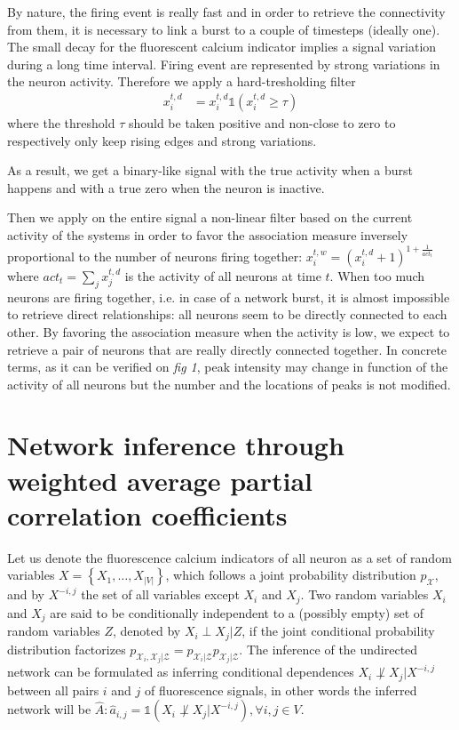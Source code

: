 \documentclass[wcp]{jmlr}
\begin{document}
By nature, the firing event is really fast and in order to
retrieve the connectivity from them, it is necessary to link a burst to a
couple of timesteps (ideally one). The small decay for the fluorescent calcium
indicator implies a signal
variation during a long time interval. Firing event are represented by strong
variations in the neuron activity. Therefore we apply a hard-tresholding
filter
\begin{align}
x^{t,d}_i &= x^{t,d}_i \mathbb{1}(x^{t,d}_i \geq \tau)
\end{align}
where the threshold $\tau$ should be taken positive and non-close to zero to
respectively only keep rising edges and strong variations.


As a result, we get a binary-like signal with the true activity when a burst
happens and with a true zero when the neuron is inactive.


Then we apply on the entire signal a non-linear filter based on the current
activity of the systems in order to favor the association measure inversely
proportional to the number of neurons firing together: $ x^{t,w}_i  =
(x^{t,d}_i + 1 )^{1 + \frac{1}{act_t}}$ where $act_t = \sum_{j} x^{t,d}_j$ is
the activity of all neurons at time $t$. When too much neurons are firing
together, i.e. in case of a network burst, it is almost impossible to retrieve
direct relationships: all neurons seem to be directly connected to each other.
By favoring the association measure when the activity is low, we expect to
retrieve a pair of neurons that are really directly connected together. In
concrete terms, as it can be verified on \textit{fig 1}, peak intensity may
change in function of the activity of all neurons but the number and the
locations of peaks is not modified.


\section{Network inference through weighted average partial correlation
            coefficients}
\label{sec:inference}

Let us denote the fluorescence calcium indicators of all neuron
as a set of random variables $X = \left\{X_1, \ldots, X_{|V|}\right\}$, which follows
a joint probability distribution $p_\mathcal{X}$, and by
$X^{-i,j}$ the set of all variables except $X_i$ and $X_j$.
Two random variables $X_i$ and $X_j$ are said to be conditionally independent
to a (possibly empty) set of random variables $Z$, denoted by $X_i \perp X_j | Z$,
if the joint conditional probability distribution factorizes
$p_{\mathcal{X}_i, \mathcal{X}_j|\mathcal{Z}} = p_{\mathcal{X}_i|\mathcal{Z}}
p_{\mathcal{X}_j|\mathcal{Z}}$.  The inference of the undirected network
can be formulated as inferring conditional dependences
$X_i \not\perp X_j | X^{-i,j}$ between all pairs $i$ and $j$ of fluorescence
signals, in other words the inferred network will be
$\hat{A}: \hat{a}_{i,j} = \mathbb{1}(X_i \not\perp X_j | X^{-i,j}), \forall i, j \in V$.
\end{document}
